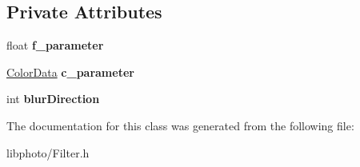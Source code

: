 \subsection*{Private Attributes}
\begin{DoxyCompactItemize}
\item 
float {\bfseries f\+\_\+parameter}\hypertarget{classFilter_a9bd610a1db8e1cde51f78b3a01b6638c}{}\label{classFilter_a9bd610a1db8e1cde51f78b3a01b6638c}

\item 
\hyperlink{classColorData}{Color\+Data} {\bfseries c\+\_\+parameter}\hypertarget{classFilter_ab5464736d6dcb521cb14ac147f68ad7e}{}\label{classFilter_ab5464736d6dcb521cb14ac147f68ad7e}

\item 
int {\bfseries blur\+Direction}\hypertarget{classFilter_a05e0243ffe83143ba6c85084824be510}{}\label{classFilter_a05e0243ffe83143ba6c85084824be510}

\end{DoxyCompactItemize}


The documentation for this class was generated from the following file\+:\begin{DoxyCompactItemize}
\item 
libphoto/Filter.\+h\end{DoxyCompactItemize}
